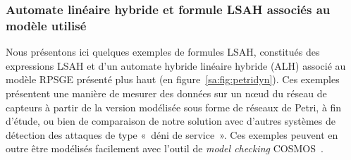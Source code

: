         \subsubsection{Automate linéaire hybride et formule LSAH associés au modèle utilisé}
Nous présentons ici quelques exemples de formules LSAH, constitués des expressions LSAH et d'un automate hybride linéaire hybride (ALH) associé au modèle RPSGE présenté plus haut (en figure~\ref{sa:fig:petridyn}).
Ces exemples présentent une manière de mesurer des données sur un nœud du réseau de capteurs à partir de la version modélisée sous forme de réseaux de Petri, à fin d'étude, ou bien de comparaison de notre solution avec d'autres systèmes de détection des attaques de type «~déni de service~».
Ces exemples peuvent en outre être modélisés facilement avec l'outil de \textit{model checking} \textsf{COSMOS}~\cite{BDDHP11cosmos}.

